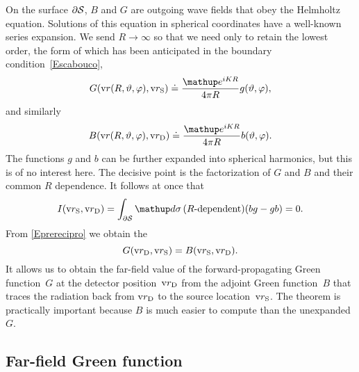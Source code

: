 On the surface $\partial\mathcal{S}$,
$B$ and $G$ are outgoing wave fields that obey the Helmholtz equation.
Solutions of this equation in spherical coordinates
have a well-known series expansion.
We send $R\to\infty$ so that we need only to retain the lowest order,
the form of which has been anticipated
in the boundary condition~\cref{Escabouco},
\begin{equation}
   G(\r(R,\vartheta,\varphi),\rS)
   \doteq \frac{\e^{iKR}}{4\pi R} g(\vartheta,\varphi),
\end{equation}
and similarly
\begin{equation}
   B(\r(R,\vartheta,\varphi),\rD)
   \doteq \frac{\e^{iKR}}{4\pi R} b(\vartheta,\varphi).
\end{equation}
The functions $g$ and $b$ can be further expanded into spherical harmonics,
but this is of no interest here.
The decisive point is the factorization of $G$ and $B$
and their common $R$ dependence.
It follows at once that
\begin{equation}
  I(\rS,\rD)
  =\displaystyle\int_{\partial\Sphere}\d\sigma\,
       (\text{$R$-dependent})(bg-gb)
  = 0.
\end{equation}
From \cref{Eprerecipro} we obtain the 
\begin{equation}\label{Ereci}
  G(\text{v}{r}_\text{D},\text{v}{r}_\text{S}) = B(\text{v}{r}_\text{S},\text{v}{r}_\text{D}).
\end{equation}
It allows us to obtain the far-field value of the
forward-propagating Green function~$G$
at the detector position~$\text{v}{r}_\text{D}$
from the adjoint Green function~$B$
that traces the radiation back from $\text{v}{r}_\text{D}$
to the source location~$\text{v}{r}_\text{S}$.
The theorem is practically important because
$B$ is much easier to compute than the unexpanded~$G$.

%

\subsection{Far-field Green function}\label{SfarDW}

